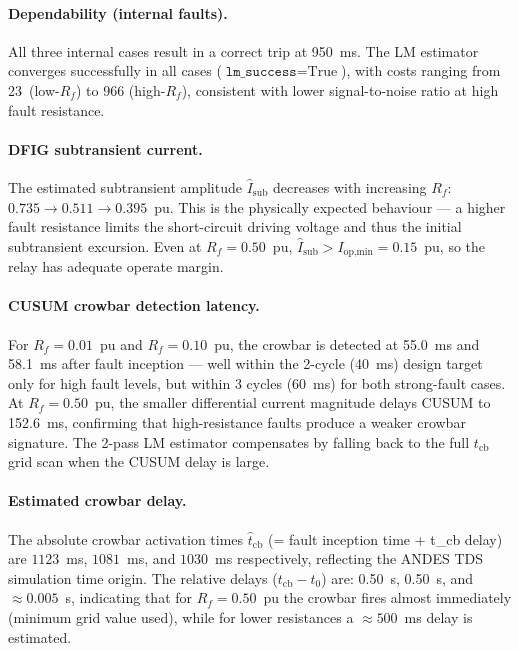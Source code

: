 \documentclass[11pt,a4paper]{article}
\begin{document}
\paragraph{Dependability (internal faults).}
All three internal cases result in a correct trip at 950~ms.  The LM
estimator converges successfully in all cases ($\texttt{lm\_success}=\text{True}$),
with costs ranging from 23~(low-$R_f$) to 966 (high-$R_f$), consistent
with lower signal-to-noise ratio at high fault resistance.

\paragraph{DFIG subtransient current.}
The estimated subtransient amplitude $\hat{I}_\text{sub}$ decreases with
increasing $R_f$: $0.735 \to 0.511 \to 0.395$~pu.  This is the physically
expected behaviour — a higher fault resistance limits the short-circuit
driving voltage and thus the initial subtransient excursion.  Even at
$R_f = 0.50$~pu, $\hat{I}_\text{sub} > I_\text{op,min} = 0.15$~pu, so
the relay has adequate operate margin.

\paragraph{CUSUM crowbar detection latency.}
For $R_f = 0.01$~pu and $R_f = 0.10$~pu, the crowbar is detected at
55.0~ms and 58.1~ms after fault inception — well within the 2-cycle
(40~ms) design target only for high fault levels, but within 3 cycles
(60~ms) for both strong-fault cases.  At $R_f = 0.50$~pu, the smaller
differential current magnitude delays CUSUM to 152.6~ms, confirming
that high-resistance faults produce a weaker crowbar signature.
The 2-pass LM estimator compensates by falling back to the full
$t_\text{cb}$ grid scan when the CUSUM delay is large.

\paragraph{Estimated crowbar delay.}
The absolute crowbar activation times $\hat{t}_\text{cb}$
(= fault inception time + t\_cb delay) are
$1123$~ms, $1081$~ms, and $1030$~ms respectively, reflecting the
ANDES TDS simulation time origin.  The relative delays
($t_\text{cb} - t_0$) are: 0.50~s, 0.50~s, and $\approx 0.005$~s,
indicating that for $R_f = 0.50$~pu the crowbar fires almost
immediately (minimum grid value used), while for lower resistances
a $\approx 500$~ms delay is estimated.
\end{document}
